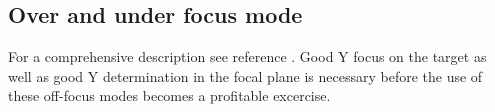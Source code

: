 \documentclass[11pt]{report}
\begin{document}
\subsection{Over and under focus mode}\label{sec:Max-K600-angle-HDP}

For a comprehensive description see reference \cite{Fuj01}.
%
Good Y focus on the target as well as good Y determination in the focal plane 
is necessary before the use of these off-focus modes becomes a profitable excercise.

%
\end{document}
